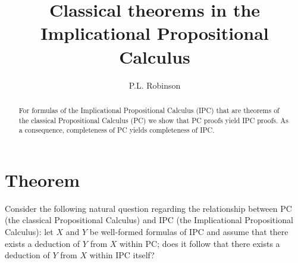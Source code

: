 \documentclass[10pt]{amsart}
\theoremstyle{plain}
\numberwithin{equation}{section}
\begin{document}
\title {Classical theorems in the Implicational Propositional Calculus}

\date{}

\author[P.L. Robinson]{P.L. Robinson}

\address{Department of Mathematics \\ University of Florida \\ Gainesville FL 32611  USA }


\subjclass{} \keywords{}

\begin{abstract}

For formulas of the Implicational Propositional Calculus (IPC) that are theorems of the classical Propositional Calculus (PC) we show that PC proofs  yield IPC proofs. As a consequence, completeness of PC yields completeness of IPC. 

\end{abstract}

\maketitle

\medbreak

\section{Theorem} 

\medbreak 

Consider the following natural question regarding the relationship between PC (the classical Propositional Calculus) and IPC (the Implicational Propositional Calculus): let $X$ and $Y$ be well-formed formulas of IPC and assume that there exists a deduction of $Y$ from $X$ within PC; does it follow that there exists a deduction of $Y$ from $X$ within IPC itself? 

\medbreak 
\end{document}

